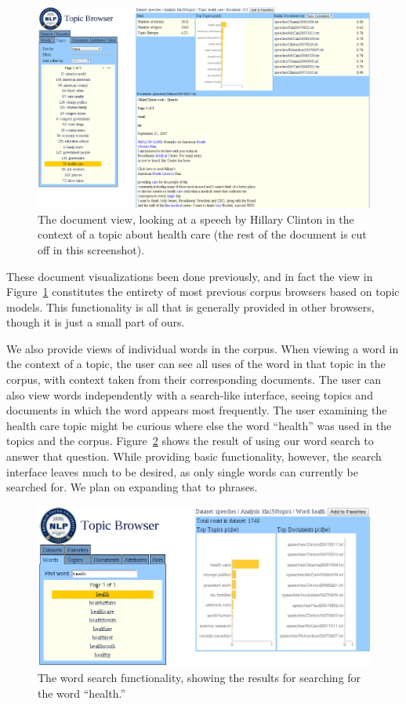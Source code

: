 \documentclass{article}
\begin{document}
\begin{figure}
  \centering
  \includegraphics[width=\textwidth]{document}
  \caption{The document view, looking at a speech by Hillary Clinton in the
  context of a topic about health care (the rest of the document is cut off in
  this screenshot).}
  \label{fig:document}
\end{figure}

These document visualizations been done previously, and in fact the view in
Figure~\ref{fig:document} constitutes the entirety of most previous corpus
browsers based on topic models.  This functionality is all that is generally
provided in other browsers, though it is just a small part of ours.

We also provide views of individual words in the corpus.  When viewing a word
in the context of a topic, the user can see all uses of the word in that topic
in the corpus, with context taken from their corresponding documents.  The user
can also view words independently with a search-like interface, seeing topics
and documents in which the word appears most frequently.  The user examining
the health care topic might be curious where else the word ``health'' was used
in the topics and the corpus.  Figure~\ref{fig:word} shows the result of using
our word search to answer that question.  While providing basic functionality,
however, the search interface leaves much to be desired, as only single words
can currently be searched for.  We plan on expanding that to phrases.

\begin{figure}
  \centering
  \includegraphics[width=.72\textwidth]{word}
  \caption{The word search functionality, showing the results for searching for
  the word ``health.''}
  \label{fig:word}
\end{figure}
\end{document}

